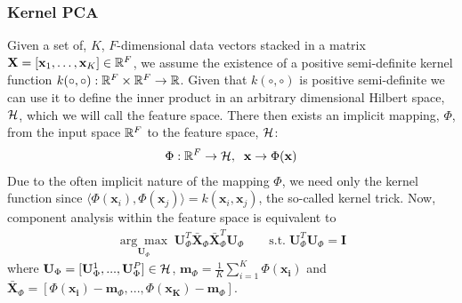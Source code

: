\subsubsection{Kernel PCA}\label{subsubsec:singl_img_ca_kpca}
Given a set of, $K$, $F$-dimensional data vectors stacked in a
matrix $\mathbf{X} = [\mathbf{x}_1, \ldots, \mathbf{x}_K] \in \mathbb{R}^F$, 
we assume the existence of a positive semi-definite kernel function 
$k(\circ, \circ) : \mathbb{R}^F \times \mathbb{R}^F \rightarrow \mathbb{R}$. Given that $k(\circ, \circ)$ 
is positive semi-definite we can use it to define the inner product in an 
arbitrary dimensional Hilbert space, $\mathcal{H}$, which we will call the feature 
space. There then exists an implicit mapping, $\Phi$, from the input 
space $\mathbb{R}^F$ to the feature space, $\mathcal{H}$:
\begin{equation}
    \begin{aligned}\label{eq:implicit-map}
        \Phi : \mathbb{R}^F \rightarrow \mathcal{H}, \; \; \mathbf{x} \rightarrow \Phi(\mathbf{x})
    \end{aligned}
\end{equation}
Due to the often implicit nature of the mapping $\Phi$, we need only the kernel 
function since 
$\langle \Phi(\mathbf{x}_i), \Phi(\mathbf{x}_j) \rangle  = k (\mathbf{x}_i, \mathbf{x}_j)$, 
the so-called kernel trick. Now, component analysis within the feature space 
is equivalent to
\begin{equation}
    \begin{aligned}\label{eq:feature-space-pca}
        \underset{\mathbf{U}_\Phi}{\arg\max} \; \mathbf{U}_\Phi^T \bar{\mathbf{X}}_\Phi \bar{\mathbf{X}}_\Phi^T \mathbf{U}_\Phi \qquad \text{s.t.} \; \mathbf{U}_\Phi^T \mathbf{U}_\Phi = \mathbf{I}
    \end{aligned}
\end{equation}
where $\mathbf{U}_\Phi = [\mathbf{U}_\Phi^1, ..., \mathbf{U}_\Phi^P] \in \mathcal{H}$,
$\mathbf{m}_\Phi = \frac{1}{K} \sum \limits_{i=1}^K \Phi(\mathbf{x_i})$ and
$\bar{\mathbf{X}}_\Phi = [\Phi(\mathbf{x_i}) - \mathbf{m}_\Phi, ..., \Phi(\mathbf{x_K}) - \mathbf{m}_\Phi]$.

